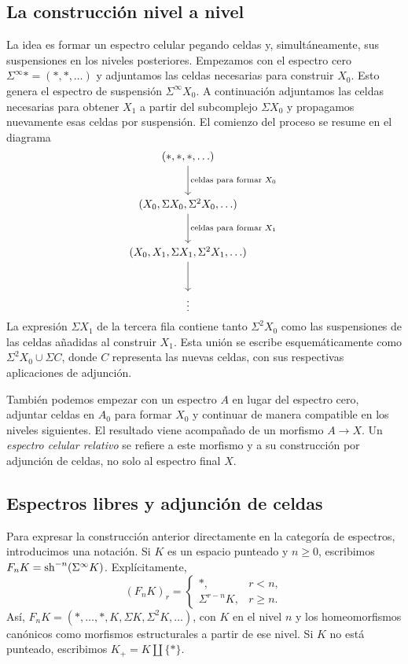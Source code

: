 \subsection{La construcción nivel a nivel}

La idea es formar un espectro celular pegando celdas y, simultáneamente, sus suspensiones en los niveles posteriores. Empezamos con el espectro cero $\Sigma^\infty *=(*,*,\ldots)$ y adjuntamos las celdas necesarias para construir $X_0$. Esto genera el espectro de suspensión $\Sigma^\infty X_0$. A continuación adjuntamos las celdas necesarias para obtener $X_1$ a partir del subcomplejo $\Sigma X_0$ y propagamos nuevamente esas celdas por suspensión. El comienzo del proceso se resume en el diagrama
\[
\begin{tikzcd}[cramped,row sep=large]
(*,*,*,\ldots)
\arrow[d,"\text{celdas para formar }X_0"]\\
(X_0,\Sigma X_0,\Sigma^2X_0,\ldots)
\arrow[d,"\text{celdas para formar }X_1"]\\
(X_0,X_1,\Sigma X_1,\Sigma^2X_1,\ldots)
\arrow[d]\\
\vdots
\end{tikzcd}
\]
La expresión $\Sigma X_1$ de la tercera fila contiene tanto $\Sigma^2X_0$ como las suspensiones de las celdas añadidas al construir $X_1$. Esta unión se escribe esquemáticamente como $\Sigma^2X_0\cup\Sigma C$, donde $C$ representa las nuevas celdas, con sus respectivas aplicaciones de adjunción.

También podemos empezar con un espectro $A$ en lugar del espectro cero, adjuntar celdas en $A_0$ para formar $X_0$ y continuar de manera compatible en los niveles siguientes. El resultado viene acompañado de un morfismo $A\to X$. Un \emph{espectro celular relativo} se refiere a este morfismo y a su construcción por adjunción de celdas, no solo al espectro final $X$.

\subsection{Espectros libres y adjunción de celdas}

Para expresar la construcción anterior directamente en la categoría de espectros, introducimos una notación. Si $K$ es un espacio punteado y $n\ge0$, escribimos $F_nK=\operatorname{sh}^{-n}(\Sigma^\infty K)$. Explícitamente,
\[
(F_nK)_r=
\begin{cases}
*,&r<n,\\
\Sigma^{r-n}K,&r\ge n.
\end{cases}
\]
Así, $F_nK=(*,\ldots,*,K,\Sigma K,\Sigma^2K,\ldots)$, con $K$ en el nivel $n$ y los homeomorfismos canónicos como morfismos estructurales a partir de ese nivel. Si $K$ no está punteado, escribimos $K_+=K\amalg\{*\}$.

